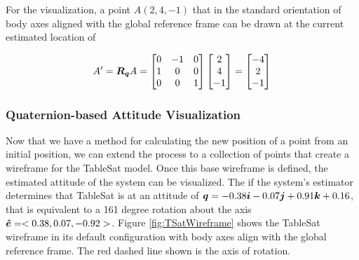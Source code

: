 For the visualization, a point $A (2, 4, -1)$ that in the standard orientation of body axes aligned with the global reference frame can be drawn at the current estimated location of

\begin{equation}
  A' = \boldsymbol{R_q} A = \begin{bmatrix} 0 & -1 & 0 \\ 1 & 0 & 0 \\ 0 & 0 & 1 \\\end{bmatrix} \begin{bmatrix} 2 \\ 4 \\ -1 \end{bmatrix} = \begin{bmatrix} -4 \\ 2 \\ -1 \end{bmatrix}
\end{equation}

\subsubsection{Quaternion-based Attitude Visualization}
\label{subsubsec:QuaternionbasedAttitudeVisualization}



Now that we have a method for calculating the new position of a point from an initial position, we can extend the process to a collection of points that create a wireframe for the TableSat model.  Once this base wireframe is defined, the estimated attitude of the system can be visualized.  The if the system's estimator determines that TableSat is at an attitude of $\boldsymbol{q} = -0.38\boldsymbol{i}-0.07\boldsymbol{j}+0.91\boldsymbol{k}+0.16$, that is equivalent to a 161 degree rotation about the axis $\boldsymbol{\hat{e}} = <0.38, 0.07, -0.92>$.  Figure \ref{fig:TSatWireframe} shows the TableSat wireframe in its default configuration with body axes align with the global reference frame.  The red dashed line shown is the axis of rotation.


